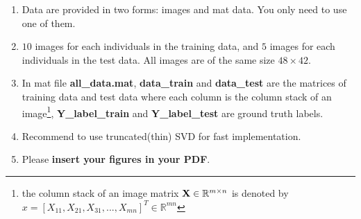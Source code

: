 \documentclass[english,onecolumn]{IEEEtran}
\newcommand{\Rbb}{\mathbb{R}}
\newcommand{\bX}{{\bf X}}
\begin{document}
\begin{enumerate}
    \item Data are provided in two forms: images and mat data. You only need to use one of them. 
    \item $10$ images for each individuals in the training data, and $5$ images for each individuals in the test data. All images are of the same size $48\times 42$.
    \item In mat file \textbf{all\_data.mat}, \textbf{data\_train} and \textbf{data\_test} are the matrices of training data and test data where each column is the column stack of an image\footnote{the column stack of an image matrix $\bX\in \Rbb^{m\times n}$ is denoted by $x = [X_{11},X_{21},X_{31},...,X_{mn}]^T\in\Rbb^{mn}$}, \textbf{Y\_label\_train} and \textbf{Y\_label\_test} are ground truth labels.
    \item Recommend to use truncated(thin) SVD for fast implementation.
    \item Please \textbf{insert your figures in your PDF}.
\end{enumerate}
\end{document}
